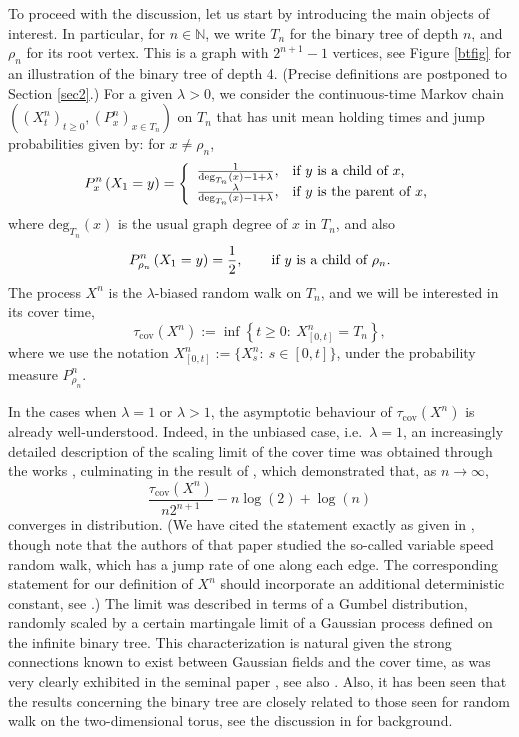 \documentclass[a4paper, 11pt]{article}
\begin{document}
To proceed with the discussion, let us start by introducing the main objects of interest. In particular, for $n\in\mathbb{N}$, we write $T_n$ for the binary tree of depth $n$, and $\rho_n$ for its root vertex. This is a graph with $2^{n+1}-1$ vertices, see Figure \ref{btfig} for an illustration of the binary tree of depth $4$. (Precise definitions are postponed to Section \ref{sec2}.) For a given $\lambda>0$, we consider the continuous-time Markov chain $((X^n_t)_{t\geq 0},({P}_x^n)_{x\in T_n})$ on $T_n$ that has unit mean holding times and jump probabilities given by: for $x\neq \rho_n$,
\begin{equation}\label{pndef}
P^n_x\left(X_1=y\right)=\left\{
                            \begin{array}{ll}
                              \frac{1}{\mathrm{deg}_{T_n}(x)-1+\lambda}, & \hbox{if $y$ is a child of $x$,} \\
                              \frac{\lambda}{\mathrm{deg}_{T_n}(x)-1+\lambda}, & \hbox{if $y$ is the parent of $x$,}
                            \end{array}
                          \right.
\end{equation}
where $\mathrm{deg}_{T_n}(x)$ is the usual graph degree of $x$ in $T_n$, and also
\[P^n_{\rho_n}\left(X_1=y\right)=\frac{1}{2},\qquad \hbox{if $y$ is a child of $\rho_n$.}\]
The process $X^n$ is the $\lambda$-biased random walk on $T_n$, and we will be interested in its cover time,
\begin{equation}\label{tcdef}
\tau_{\mathrm{cov}}(X^n):=\inf\left\{t\geq 0:\:X_{[0,t]}^n=T_n\right\},
\end{equation}
where we use the notation $X_{[0,t]}^n:=\{X_s^n:\:s\in[0,t]\}$, under the probability measure ${P}_{\rho_n}^n$.

In the cases when $\lambda=1$ or $\lambda>1$, the asymptotic behaviour of $\tau_{\mathrm{cov}}(X^n)$ is already well-understood. Indeed, in the unbiased case, i.e.\ $\lambda=1$, an increasingly detailed description of the scaling limit of the cover time was obtained through the works \cite{Ald,BRZ,BZ,DZ}, culminating in the result of \cite{CLS}, which demonstrated that, as $n\rightarrow\infty$,
\[\frac{\tau_{\mathrm{cov}}(X^n)}{n2^{n+1}}-n\log(2)+\log(n)\]
converges in distribution. (We have cited the statement exactly as given in \cite{CLS}, though note that the authors of that paper studied the so-called variable speed random walk, which has a jump rate of one along each edge. The corresponding statement for our definition of $X^n$ should incorporate an additional deterministic constant, see \cite[Remark 1]{CLS}.) The limit was described in terms of a Gumbel distribution, randomly scaled by a certain martingale limit of a Gaussian process defined on the infinite binary tree. This characterization is natural given the strong connections known to exist between Gaussian fields and the cover time, as was very clearly exhibited in the seminal paper \cite{DLP}, see also \cite{Ding}. Also, it has been seen that the results concerning the binary tree are closely related to those seen for random walk on the two-dimensional torus, see the discussion in \cite{CLS} for background.
\end{document}
